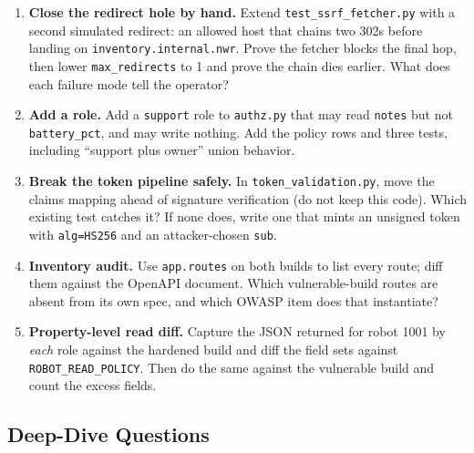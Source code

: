 \begin{enumerate}[label=\textbf{E16.\arabic*.}, leftmargin=1.9cm, itemsep=0.4em]
  \item \textbf{Close the redirect hole by hand.} Extend
        \texttt{test\_ssrf\_fetcher.py} with a second simulated redirect:
        an allowed host that chains two 302s before landing on
        \texttt{inventory.internal.nwr}. Prove the fetcher blocks the final
        hop, then lower \texttt{max\_redirects} to 1 and prove the chain
        dies earlier. What does each failure mode tell the operator?
  \item \textbf{Add a role.} Add a \texttt{support} role to
        \texttt{authz.py} that may read \texttt{notes} but not
        \texttt{battery\_pct}, and may write nothing. Add the policy rows
        and three tests, including ``support plus owner'' union behavior.
  \item \textbf{Break the token pipeline safely.} In
        \texttt{token\_validation.py}, move the claims mapping ahead of
        signature verification (do not keep this code). Which existing test
        catches it? If none does, write one that mints an unsigned token
        with \texttt{alg=HS256} and an attacker-chosen \texttt{sub}.
  \item \textbf{Inventory audit.} Use \texttt{app.routes} on both builds to
        list every route; diff them against the OpenAPI document. Which
        vulnerable-build routes are absent from its own spec, and which
        OWASP item does that instantiate?
  \item \textbf{Property-level read diff.} Capture the JSON returned for
        robot 1001 by \emph{each} role against the hardened build and diff
        the field sets against \texttt{ROBOT\_READ\_POLICY}. Then do the
        same against the vulnerable build and count the excess fields.
\end{enumerate}

\subsection*{Deep-Dive Questions}

